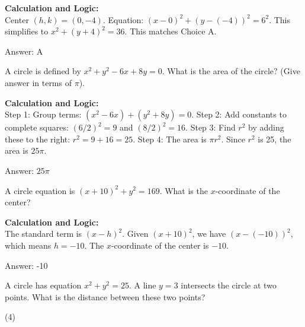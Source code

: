 \documentclass[11pt,paper=a4,answers]{exam}
\begin{document}
\begin{questions}
\begin{solution}
\textbf{Calculation and Logic:} \\
Center $(h, k) = (0, -4)$. Equation: $(x - 0)^2 + (y - (-4))^2 = 6^2$. This simplifies to $x^2 + (y + 4)^2 = 36$. This matches Choice A.

\vspace{30pt}

Answer: \colorbox{yellow!100}{A}
\end{solution}

\vspace{60pt}

\question
A circle is defined by $x^2 + y^2 - 6x + 8y = 0$. What is the area of the circle? (Give answer in terms of $\pi$).

\begin{solution}
\textbf{Calculation and Logic:} \\
Step 1: Group terms: $(x^2 - 6x) + (y^2 + 8y) = 0$. Step 2: Add constants to complete squares: $(6/2)^2 = 9$ and $(8/2)^2 = 16$. Step 3: Find $r^2$ by adding these to the right: $r^2 = 9 + 16 = 25$. Step 4: The area is $\pi r^2$. Since $r^2$ is 25, the area is $25\pi$.

\vspace{30pt}

Answer: \colorbox{yellow!100}{$25\pi$}
\end{solution}

\vspace{60pt}

\question
A circle equation is $(x + 10)^2 + y^2 = 169$. What is the $x$-coordinate of the center?

\begin{solution}
\textbf{Calculation and Logic:} \\
The standard term is $(x - h)^2$. Given $(x + 10)^2$, we have $(x - (-10))^2$, which means $h = -10$. The $x$-coordinate of the center is $-10$.

\vspace{30pt}

Answer: \colorbox{yellow!100}{-10}
\end{solution}

\vspace{60pt}

\question
A circle has equation $x^2 + y^2 = 25$. A line $y = 3$ intersects the circle at two points. What is the distance between these two points?
\begin{tasks}(4)
\end{tasks}


\end{questions}
\end{document}
